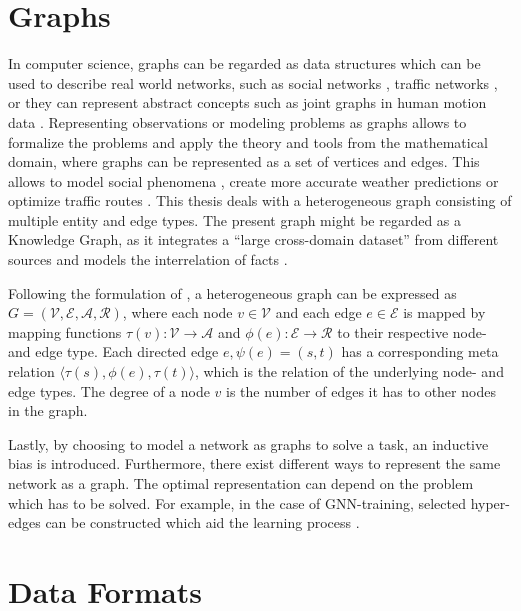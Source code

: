 \section{Graphs}
In computer science, graphs can be regarded as data structures which can be used to describe real world networks, such as social networks \parencite{leskovec2008planetary}, traffic networks \parencite{derrow2021eta}, or they can represent abstract concepts such as joint graphs in human motion data \parencite{li2020dynamic}. Representing observations or modeling problems as graphs allows to formalize the problems and apply the theory and tools from the mathematical domain, where graphs can be represented as a set of vertices and edges. This allows to model social phenomena \parencite{leskovec2008planetary}, create more accurate weather predictions \parencite{khodayar2018spatio} or optimize traffic routes \parencite{derrow2021eta}. This thesis deals with a heterogeneous graph consisting of multiple entity and edge types. The present graph might be regarded as a Knowledge Graph, as it integrates a ``large cross-domain dataset'' \parencite{paulheim2017knowledge} from different sources and models the interrelation of facts \parencite{pujara2013knowledge}.

Following the formulation of \parencite{hu2020heterogeneous}, a heterogeneous graph can be expressed as 
$G = (\mathcal{V}, \mathcal{E}, \mathcal{A}, \mathcal{R})$,
where each node $v \in \mathcal{V}$ and each edge $e \in \mathcal{E}$ is mapped by mapping functions $\tau(v) : \mathcal{V} \to \mathcal{A}$ and $\phi(e) : \mathcal{E} \to \mathcal{R}$ to their respective node- and edge type. Each directed edge $e, \psi(e) = (s,t)$ has a corresponding meta relation $\langle \tau(s), \phi(e), \tau(t) \rangle$, which is the relation of the underlying node- and edge types. The degree of a node $v$ is the number of edges it has to other nodes in the graph.


Lastly, by choosing to model a network as graphs to solve a task, an inductive bias is introduced.  Furthermore, there exist different ways to represent the same network as a graph. The optimal representation can depend on the problem which has to be solved. For example, in the case of GNN-training, selected hyper-edges can be constructed which aid the learning process \parencite{yadati2019hypergcn}. 
\section{Data Formats}
\label{sec:dataformats}



